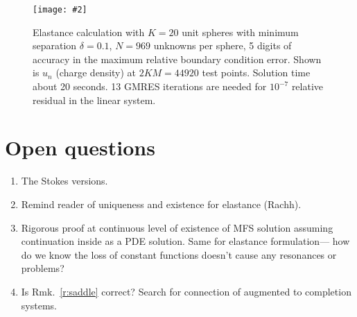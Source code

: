 \documentclass[10pt]{article}
\newcommand{\ben}{\begin{enumerate}}
\newcommand{\een}{\end{enumerate}}
\newcommand{\bfi}{\begin{figure}}
\newcommand{\efi}{\end{figure}}
\newcommand{\ca}[2]{\caption{#1 \label{#2}}}
\newcommand{\ig}[2]{\texttt{[image: \#2]}}
\begin{document}
\bfi
\centering \ig{width=5in}{un_K20_d0.1.png}
\ca{Elastance calculation with $K=20$ unit spheres with minimum separation
  $\delta=0.1$, $N=969$ unknowns per sphere, 5 digits of accuracy in the maximum relative boundary condition error. Shown is $u_n$ (charge density)
  at $2KM= 44920$ test points. Solution time about 20 seconds.
13 GMRES iterations are needed for $10^{-7}$ relative residual in the linear system.}{f:elast}
\efi


\section{Open questions}

\ben
\item The Stokes versions.
\item Remind reader of uniqueness and existence for elastance (Rachh).
\item Rigorous proof at continuous level of existence of MFS solution assuming
  continuation inside as a PDE solution. Same for elastance formulation---%
  how do we know the loss of constant functions doesn't cause any resonances
  or problems?
\item Is Rmk.~\ref{r:saddle} correct? Search for connection
  of augmented to completion systems.
\een




\end{document}
